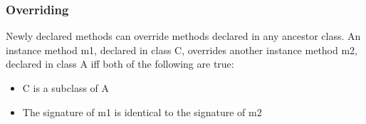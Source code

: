 \begin{homeworkProblem}
	\subsubsection{Overriding}
	Newly declared methods can override methods declared in any ancestor class. An instance method m1, declared in class C, overrides another instance method m2, declared in class A iff both of the following are true:
	\begin{itemize}
		\item C is a subclass of A
		\item The signature of m1 is identical to the signature of m2
	\end{itemize}
	
\end{homeworkProblem}
